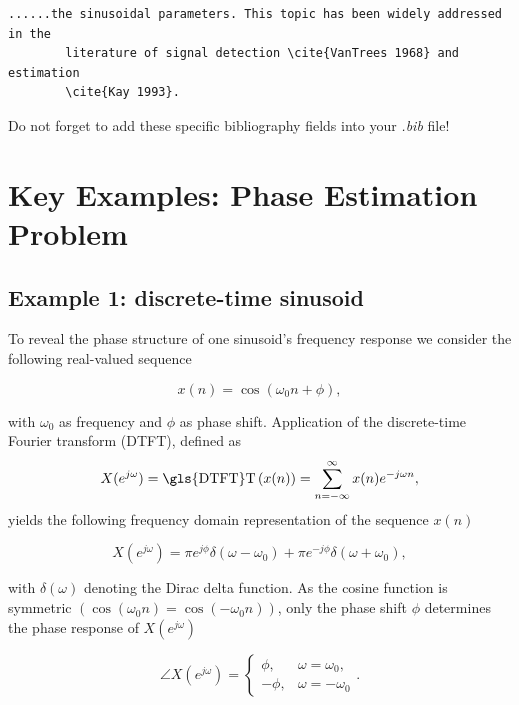 \begin{mdframed}
	\begin{lstlisting}[language = Tex, caption={Add citations into your text}]
		......the sinusoidal parameters. This topic has been widely addressed in the 
		literature of signal detection \cite{VanTrees 1968} and estimation 
		\cite{Kay 1993}.
	\end{lstlisting}
	Do not forget to add these specific bibliography fields into your \emph{.bib} file!
\end{mdframed}

\section{Key Examples: Phase Estimation Problem}\label{ch3:PE1}
\subsection{Example 1: discrete-time sinusoid}
\noindent To reveal the phase structure of one sinusoid's frequency response we consider the following real-valued sequence

\begin{equation}
	\label{eq:c3.1}
	x(n)=\cos(\omega_0n+\phi),
\end{equation}

\noindent with $\omega_0$ as frequency and $\phi$ as phase shift. Application of the discrete-time Fourier transform (\gls{DTFT}), defined as
\begin{equation}\label{eq:c3.2}
	X(e^{j\omega})=\text{\gls{DTFT}T}\left(x(n)\right)=\sum_{n=-\infty}^{\infty}x(n)e^{-j\omega n},
\end{equation}
yields the following frequency domain representation of the sequence $x(n)$

\begin{equation}\label{eq:c3.3}
	X(e^{j\omega})=\pi e^{j\phi}\delta(\omega-\omega_0)+\pi e^{-j\phi}\delta(\omega+\omega_0),
\end{equation}

\noindent with $\delta(\omega)$ denoting the Dirac delta function. As the cosine function is symmetric $\left(\cos(\omega_0 n)=\cos(-\omega_0 n)\right)$, only the phase shift $\phi$ determines the phase response of $X(e^{j\omega})$

\begin{equation}\label{eq:c3.4}
	\angle X(e^{j\omega})=\begin{cases}\phi, & \omega=\omega_0,\\
		-\phi, & \omega=-\omega_0
	\end{cases}.
\end{equation}

